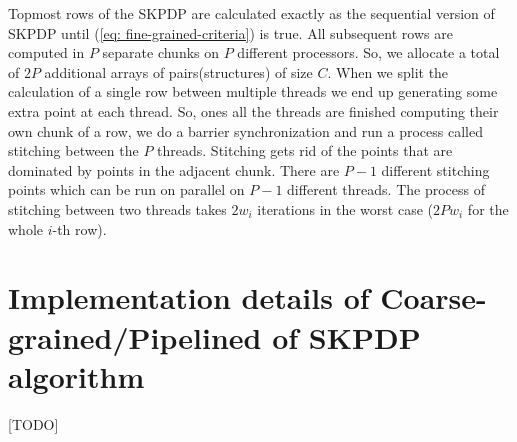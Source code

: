 Topmost rows of the SKPDP are calculated exactly as the sequential version of SKPDP until (\ref{eq: fine-grained-criteria}) is true. All subsequent rows are computed in $P$ separate chunks on $P$ different processors. So, we allocate a total of $2P$ additional arrays of pairs(structures) of size $C$. When we split the calculation of a single row between multiple threads we end up generating some extra point at each thread. So, ones all the threads are finished computing their own chunk of a row, we do a barrier synchronization and run a process called stitching between the $P$ threads. Stitching gets rid of the points that are dominated by points in the adjacent chunk. There are $P-1$ different stitching points which can be run on parallel on $P-1$ different threads. The process of stitching between two threads takes $2w_i$ iterations in the worst case ($2P w_i$ for the whole $i$-th row).



\section{Implementation details of Coarse-grained/Pipelined of SKPDP algorithm}



[TODO]



